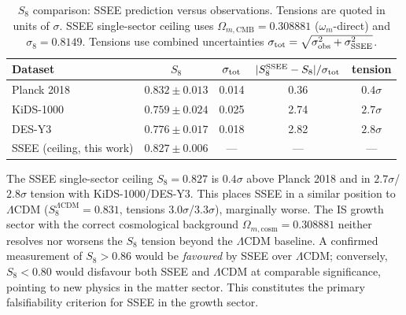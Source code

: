 \documentclass[12pt,a4paper]{article}
\begin{document}
\begin{table}[h!]
\centering
\caption{$S_8$ comparison: SSEE prediction versus observations.
  Tensions are quoted in units of $\sigma$.
  SSEE single-sector ceiling uses $\Omega_{m,\mathrm{CMB}} = 0.308881$
  ($\omega_m$-direct) and $\sigma_8 = 0.8149$.
  Tensions use combined uncertainties $\sigma_{\rm tot} = \sqrt{\sigma_{\rm obs}^2 + \sigma_{\rm SSEE}^2}$.}
\label{tab:S8}
\begin{tabular}{lcccc}
\toprule
Dataset & $S_8$ & $\sigma_{\rm tot}$ & $|S_8^{\mathrm{SSEE}} - S_8|/\sigma_{\rm tot}$ & tension \\
\midrule
Planck 2018 & $0.832 \pm 0.013$ & 0.014 & 0.36 & $0.4\sigma$ \\
KiDS-1000   & $0.759 \pm 0.024$ & 0.025 & 2.74 & $2.7\sigma$ \\
DES-Y3      & $0.776 \pm 0.017$ & 0.018 & 2.82 & $2.8\sigma$ \\
\midrule
SSEE (ceiling, this work) & $0.827 \pm 0.006$ & — & — & — \\
\bottomrule
\end{tabular}
\end{table}

The SSEE single-sector ceiling $S_8 = 0.827$ is $0.4\sigma$ above Planck 2018 and in
$2.7\sigma$/$2.8\sigma$ tension with KiDS-1000/DES-Y3.
This places SSEE in a similar position to $\Lambda$CDM ($S_8^{\Lambda\mathrm{CDM}}=0.831$,
tensions $3.0\sigma$/$3.3\sigma$), marginally worse.
The IS growth sector with the correct cosmological background $\Omega_{m,\mathrm{cosm}}=0.308881$
neither resolves nor worsens the $S_8$ tension beyond the $\Lambda$CDM baseline.
A confirmed measurement of $S_8 > 0.86$ would be \emph{favoured} by SSEE over $\Lambda$CDM;
conversely, $S_8 < 0.80$ would disfavour both SSEE and $\Lambda$CDM at comparable
significance, pointing to new physics in the matter sector.
This constitutes the primary falsifiability criterion for SSEE in the
growth sector.
\end{document}
